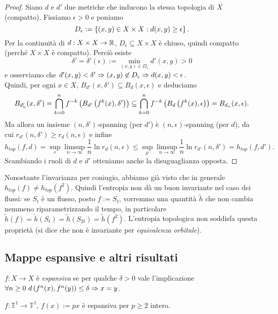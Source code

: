 \begin{proof}Siano $d$ e $d'$ due metriche che inducono la stessa topologia di $X$ (compatto).
Fissiamo $\epsilon>0$ e poniamo
\[ D_\epsilon:=\left\{(x,y)\in X\times X:d(x,y)\ge\epsilon\right\}. \]
Per la continuità di $d:X\times X\to\mathbb{R}$, $D_\epsilon\subseteq X\times X$ è chiuso, quindi compatto (perché $X\times X$ è compatto).
Perciò esiste
\[ \delta'=\delta'(\epsilon):=\min_{(x,y)\in D_\epsilon}d'(x,y)>0 \]
e osserviamo che $d'(x,y)<\delta'\Rightarrow (x,y)\not\in D_\epsilon\Rightarrow d(x,y)<\epsilon$. \\
Quindi, per ogni $x\in X$, $B_{d'}(x,\delta')\subseteq B_d(x,\epsilon)$ e deduciamo
\[ B_{d'_n}(x,\delta')=\bigcap_{k=0}^n f^{-k}\left(B_{d'}\left(f^k(x),\delta'\right)\right)\subseteq\bigcap_{k=0}^n f^{-k}\left(B_d\left(f^k(x),\epsilon\right)\right)
=B_{d_n}(x,\epsilon). \]
Ma allora un insieme $(n,\delta')$-spanning (per $d'$) è $(n,\epsilon)$-spanning (per $d$), da cui
$r_{d'}(n,\delta')\ge r_d(n,\epsilon)$ e infine
\[ h_{top}(f,d)=\sup_\epsilon \limsup_{n\to\infty}\frac{1}{n}\ln r_d(n,\epsilon)
\le \sup_{\delta'}\limsup_{n\to\infty}\frac{1}{n}\ln r_{d'}(n,\delta')=h_{top}(f,d'). \]
Scambiando i ruoli di $d$ e $d'$ otteniamo anche la disuguaglianza opposta.
\end{proof}

\begin{oss}Nonostante l'invarianza per coniugio, abbiamo già visto che in generale $h_{top}(f)\neq h_{top}(f^2)$.
Quindi l'entropia non dà un buon invariante nel caso dei flussi: se $S_t$ è un flusso, posto $f:=S_t$, vorremmo
una quantità $\tilde{h}$ che non cambia nemmeno riparametrizzando il tempo, in particolare
$\tilde{h}(f)=\tilde{h}(S_t)=\tilde{h}(S_{2t})=\tilde{h}(f^2)$.
L'entropia topologica non soddisfa questa proprietà (si dice che non è invariante per \emph{equivalenza orbitale}).
\end{oss}

\subsection{Mappe espansive e altri risultati}

\begin{defi}$f:X\to X$ è \emph{espansiva} se per qualche $\delta>0$ vale l'implicazione
$\forall n\ge 0\ d\pa{f^n(x),f^n(y)}\le\delta\implica x=y$.
\end{defi}

\begin{esempio}$f:\mathbb{T}^1\to\mathbb{T}^1$, $f(x):=px$ è espansiva per $p\ge 2$ intero.
\end{esempio}

